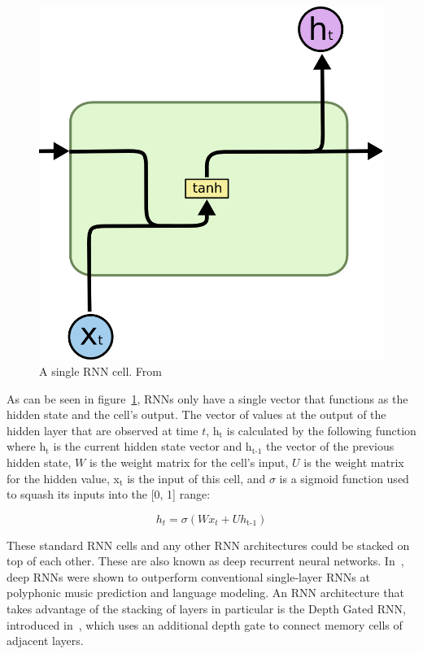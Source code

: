 \begin{figure}
	\begin{center}
		\includegraphics[scale=0.5]{rnn/rnn_cell}
	\end{center}
	\caption{A single RNN cell. From~\cite{olah2015understanding}\label{fig:rnn_cell}}
\end{figure}

As can be seen in figure~\ref{fig:rnn_cell}, RNNs only have a single vector that functions as the hidden state and the cell's output. The vector of values at the output of the hidden layer that are observed at time \(t\), h\(_{\text{t}}\) is calculated by the following function where h\(_{\text{t}}\) is the current hidden state vector and h\(_{\text{t-1}}\) the vector of the previous hidden state, \(W\) is the weight matrix for the cell's input, \(U\) is the weight matrix for the hidden value, x\(_{\text{t}}\) is the input of this cell, and \(\sigma \) is a sigmoid function used to squash its inputs into the [0, 1] range:

\begin{equation} \label{eq:hidden_gate_lstm}
h_t = \sigma(Wx_t + Uh_\text{t-1})
\end{equation}

These standard RNN cells and any other RNN architectures could be stacked on top of each other. These are also known as deep recurrent neural networks. In~\cite{pascanu2013construct}, deep RNNs were shown to outperform conventional single-layer RNNs at polyphonic music prediction and language modeling. An RNN architecture that takes advantage of the stacking of layers in particular is the Depth Gated RNN, introduced in~\cite{yao2015depth}, which uses an additional depth gate to connect memory cells of adjacent layers.

